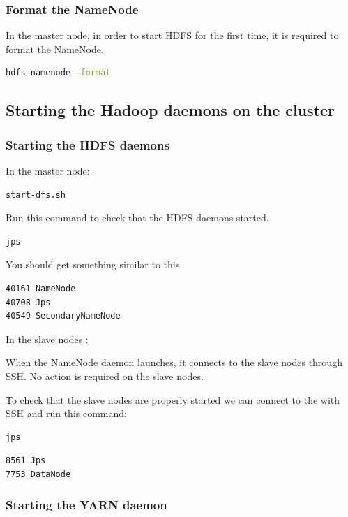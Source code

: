 \documentclass[12pt,english]{book}
\begin{document}
\subsubsection{Format the NameNode}


In the master node, in order to start HDFS for the first time, it is required to format the NameNode.
\begin{lstlisting}[language=bash, frame=single]
hdfs namenode -format
\end{lstlisting}


\subsection{Starting the Hadoop daemons on the cluster}


\subsubsection{Starting the HDFS daemons}


In the master node:
\begin{lstlisting}[language=bash, frame=single]
start-dfs.sh
\end{lstlisting}

Run this command to check that the HDFS daemons started.
\begin{lstlisting}[language=bash, frame=single]
jps
\end{lstlisting}
You should get something similar to this
\begin{lstlisting}[language=bash, frame=single]
40161 NameNode
40708 Jps
40549 SecondaryNameNode
\end{lstlisting}

In the slave nodes :

When the NameNode daemon launches, it connects to the slave nodes through SSH. No action is required on the slave nodes. 

To check that the slave nodes are properly started we can connect to the with SSH and run this command:
\begin{lstlisting}[language=bash, frame=single]
jps
\end{lstlisting}

\begin{lstlisting}[language=bash, frame=single]
8561 Jps
7753 DataNode
\end{lstlisting}

\subsubsection{Starting the YARN daemon}
\end{document}
